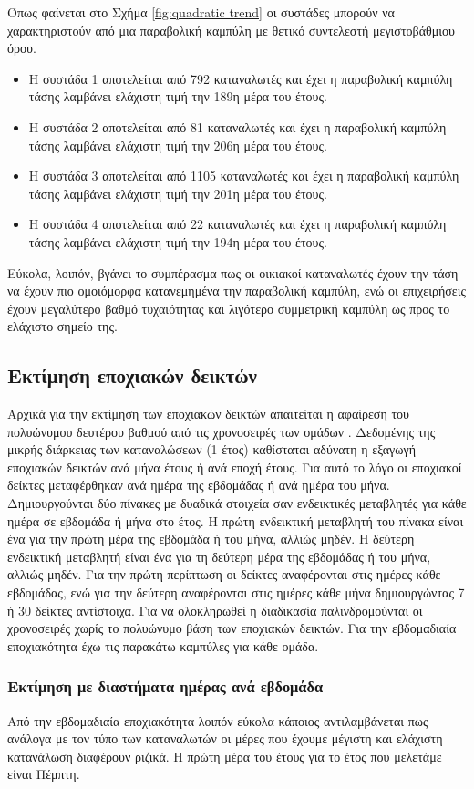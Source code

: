 Όπως φαίνεται στο Σχήμα \ref{fig:quadratic trend} οι συστάδες μπορούν να χαρακτηριστούν από μια παραβολική καμπύλη με θετικό συντελεστή μεγιστοβάθμιου όρου.
\begin{itemize}
\item Η συστάδα 1 αποτελείται από 792 καταναλωτές και έχει η παραβολική καμπύλη τάσης λαμβάνει ελάχιστη τιμή την 189η μέρα του έτους.
\item Η συστάδα 2 αποτελείται από 81 καταναλωτές και έχει η παραβολική καμπύλη τάσης λαμβάνει ελάχιστη τιμή την 206η μέρα του έτους. 
\item Η συστάδα 3 αποτελείται από 1105 καταναλωτές και έχει η παραβολική καμπύλη τάσης λαμβάνει ελάχιστη τιμή την 201η μέρα του έτους.
\item Η συστάδα 4 αποτελείται από 22 καταναλωτές και έχει η παραβολική καμπύλη τάσης λαμβάνει ελάχιστη τιμή την 194η μέρα του έτους.
\end{itemize}

Εύκολα, λοιπόν, βγάνει το συμπέρασμα πως οι οικιακοί καταναλωτές έχουν την τάση να έχουν πιο ομοιόμορφα κατανεμημένα την παραβολική καμπύλη, ενώ οι επιχειρήσεις έχουν μεγαλύτερο βαθμό τυχαιότητας και λιγότερο συμμετρική καμπύλη ως προς το ελάχιστο σημείο της.
\subsection{Εκτίμηση εποχιακών δεικτών}
Αρχικά για την εκτίμηση των εποχιακών δεικτών απαιτείται η αφαίρεση του πολυώνυμου δευτέρου βαθμού από τις χρονοσειρές των ομάδων \cite{timeseriesanalysis}.  Δεδομένης της μικρής διάρκειας των καταναλώσεων (1 έτος) καθίσταται αδύνατη η εξαγωγή εποχιακών δεικτών ανά μήνα έτους ή ανά εποχή έτους. Για αυτό το λόγο οι εποχιακοί δείκτες μεταφέρθηκαν ανά ημέρα της εβδομάδας ή ανά ημέρα του μήνα. Δημιουργούνται δύο πίνακες με δυαδικά στοιχεία σαν ενδεικτικές μεταβλητές για κάθε ημέρα σε εβδομάδα ή μήνα στο έτος. Η πρώτη ενδεικτική μεταβλητή του πίνακα είναι ένα για την πρώτη μέρα της εβδομάδα ή του μήνα, αλλιώς μηδέν. Η δεύτερη ενδεικτική μεταβλητή είναι ένα για τη δεύτερη μέρα της εβδομάδας ή του μήνα, αλλιώς μηδέν. Για την πρώτη περίπτωση οι δείκτες αναφέρονται στις ημέρες κάθε εβδομάδας, ενώ για την δεύτερη αναφέρονται στις ημέρες κάθε μήνα δημιουργώντας 7 ή 30 δείκτες αντίστοιχα. Για να ολοκληρωθεί η διαδικασία παλινδρομούνται οι χρονοσειρές χωρίς το πολυώνυμο βάση των εποχιακών δεικτών. Για την εβδομαδιαία εποχιακότητα έχω τις παρακάτω καμπύλες για κάθε ομάδα.
\subsubsection{Εκτίμηση με διαστήματα ημέρας ανά εβδομάδα}
Από την εβδομαδιαία εποχιακότητα λοιπόν εύκολα κάποιος αντιλαμβάνεται πως ανάλογα με τον τύπο των καταναλωτών οι μέρες που έχουμε μέγιστη και ελάχιστη κατανάλωση διαφέρουν ριζικά. Η πρώτη μέρα του έτους για το έτος που μελετάμε είναι Πέμπτη.\par

